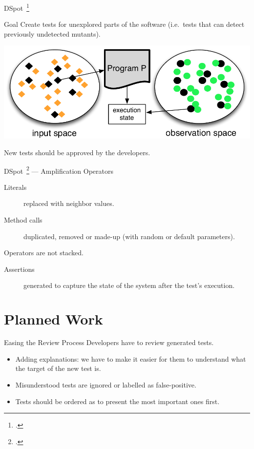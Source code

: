 \documentclass{beamer}
\begin{document}
\begin{frame}{DSpot~\footcite{baudry2015dspot}}
  \begin{block}{Goal}
    Create tests for unexplored parts of the software (i.e.\ tests that can detect previously undetected mutants).
  \end{block}

  \begin{center}
    \includegraphics[scale=0.45]{io-spaces.pdf}

  \end{center}

  \pause{}

  \alert{New tests should be approved by the developers.}
\end{frame}
\begin{frame}{DSpot~\footcite{baudry2015dspot} --- Amplification Operators}
  \begin{description}
    \item[Literals] replaced with neighbor values.
    \item[Method calls] duplicated, removed or made-up (with random or default parameters).
  \end{description}
  Operators are not stacked.

  \vfill
  \pause{}

  \begin{description}
    \item[Assertions] generated to capture the state of the system after the test's execution.
  \end{description}
\end{frame}


\section{Planned Work}

\begin{frame}{Easing the Review Process}
  Developers have to review generated tests.
  \begin{itemize}
    \item Adding explanations: we have to make it easier for them to understand what the target of the new test is.
    \item Misunderstood tests are ignored or labelled as false-positive.
    \item Tests should be ordered as to present the most important ones first.
  \end{itemize}
\end{frame}
\end{document}
